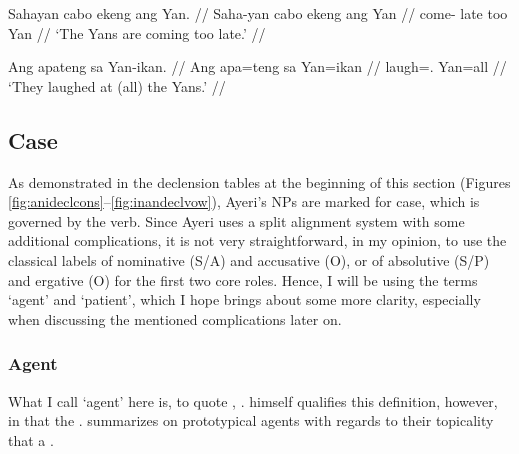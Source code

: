 \pex
\a\begingl
	\gla Sahayan cabo ekeng ang Yan. //
	\glb Saha-yan cabo ekeng ang Yan //
	\glc come-\TplM{} late too \Aarg{} Yan //
	\glft `The Yans are coming too late.' //
\endgl

\a\begingl
	\gla Ang apateng sa Yan-ikan. //
	\glb Ang apa=teng sa Yan=ikan //
	\glc \AgtT{} laugh=\TplF{}.\Aarg{} \Parg{} Yan=all //
	\glft `They laughed at (all) the Yans.' //
\endgl

\xe


\subsection{Case}
\label{subsec:case}

As demonstrated in the declension tables at the beginning of this section
(Figures \ref{fig:anideclcons}–\ref{fig:inandeclvow}), Ayeri's NPs are marked
for case, which is governed by the verb. Since Ayeri uses a split alignment
system with some additional complications, it is not very straightforward, in
my opinion, to use the classical labels of nominative (S/A) and accusative (O),
or of absolutive (S/P) and ergative (O) for the first two core roles. Hence, I
will be using the terms `agent' and `patient', which I hope brings about some
more clarity, especially when discussing the mentioned complications later on.


\subsubsection{Agent}

What I call `agent' here is, to quote \citet{fillmore1968},
. \citet{fillmore1968}
himself qualifies this definition, however, in that the . \citet{payne1997} summarizes on prototypical agents with regards
to their topicality that a .

